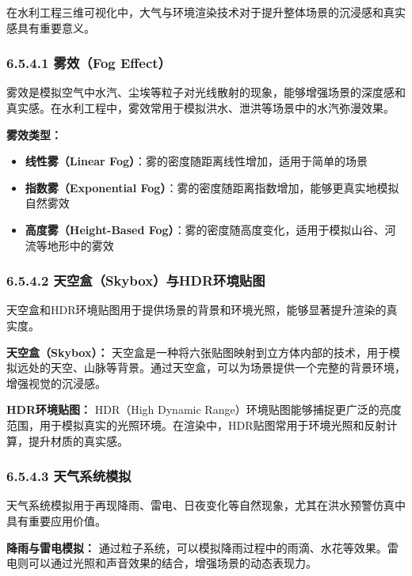 在水利工程三维可视化中，大气与环境渲染技术对于提升整体场景的沉浸感和真实感具有重要意义。

\subsubsection{6.5.4.1 雾效（Fog Effect）}\label{ux96feux6548fog-effect}

雾效是模拟空气中水汽、尘埃等粒子对光线散射的现象，能够增强场景的深度感和真实感。在水利工程中，雾效常用于模拟洪水、泄洪等场景中的水汽弥漫效果。

\textbf{雾效类型：}

\begin{itemize}
\tightlist
\item
  \textbf{线性雾（Linear
  Fog）}：雾的密度随距离线性增加，适用于简单的场景
\item
  \textbf{指数雾（Exponential
  Fog）}：雾的密度随距离指数增加，能够更真实地模拟自然雾效
\item
  \textbf{高度雾（Height-Based
  Fog）}：雾的密度随高度变化，适用于模拟山谷、河流等地形中的雾效
\end{itemize}

\subsubsection{6.5.4.2
天空盒（Skybox）与HDR环境贴图}\label{ux5929ux7a7aux76d2skyboxux4e0ehdrux73afux5883ux8d34ux56fe}

天空盒和HDR环境贴图用于提供场景的背景和环境光照，能够显著提升渲染的真实度。

\textbf{天空盒（Skybox）：}
天空盒是一种将六张贴图映射到立方体内部的技术，用于模拟远处的天空、山脉等背景。通过天空盒，可以为场景提供一个完整的背景环境，增强视觉的沉浸感。

\textbf{HDR环境贴图：} HDR（High Dynamic
Range）环境贴图能够捕捉更广泛的亮度范围，用于模拟真实的光照环境。在渲染中，HDR贴图常用于环境光照和反射计算，提升材质的真实感。

\subsubsection{6.5.4.3
天气系统模拟}\label{ux5929ux6c14ux7cfbux7edfux6a21ux62df}

天气系统模拟用于再现降雨、雷电、日夜变化等自然现象，尤其在洪水预警仿真中具有重要应用价值。

\textbf{降雨与雷电模拟：}
通过粒子系统，可以模拟降雨过程中的雨滴、水花等效果。雷电则可以通过光照和声音效果的结合，增强场景的动态表现力。


